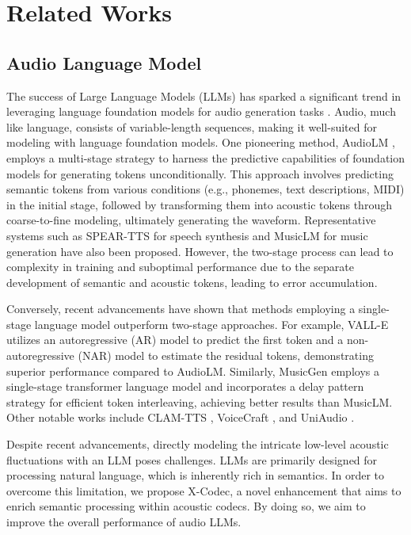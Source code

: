 \section{Related Works}

\subsection{Audio Language Model}

The success of Large Language Models (LLMs) has sparked a significant trend in leveraging language foundation models for audio generation tasks \cite{rubenstein2023audiopalm,zhang2024speechlm,wu2023decoder,wu2023speechgen,yang2023uniaudio,chen2023lauragpt}. Audio, much like language, consists of variable-length sequences, making it well-suited for modeling with language foundation models. One pioneering method, AudioLM \cite{borsos2023audiolm}, employs a multi-stage strategy to harness the predictive capabilities of foundation models for generating tokens unconditionally. This approach involves predicting semantic tokens from various conditions (e.g., phonemes, text descriptions, MIDI) in the initial stage, followed by transforming them into acoustic tokens through coarse-to-fine modeling, ultimately generating the waveform. Representative systems such as SPEAR-TTS \cite{kharitonov2023speak} for speech synthesis and MusicLM \cite{agostinelli2023musiclm} for music generation have also been proposed. However, the two-stage process can lead to complexity in training and suboptimal performance due to the separate development of semantic and acoustic tokens, leading to error accumulation.

Conversely, recent advancements have shown that methods employing a single-stage language model outperform two-stage approaches. For example, VALL-E \cite{wang2023neural} utilizes an autoregressive (AR) model to predict the first token and a non-autoregressive (NAR) model to estimate the residual tokens, demonstrating superior performance compared to AudioLM. Similarly, MusicGen \cite{copet2024simple} employs a single-stage transformer language model and incorporates a delay pattern strategy for efficient token interleaving, achieving better results than MusicLM. Other notable works include CLAM-TTS \cite{kim2024clam}, VoiceCraft \cite{peng2024voicecraft}, and UniAudio \cite{yang2023uniaudio}.

Despite recent advancements, directly modeling the intricate low-level acoustic fluctuations with an LLM poses challenges. LLMs are primarily designed for processing natural language, which is inherently rich in semantics. In order to overcome this limitation, we propose X-Codec, a novel enhancement that aims to enrich semantic processing within acoustic codecs. By doing so, we aim to improve the overall performance of audio LLMs.
  

